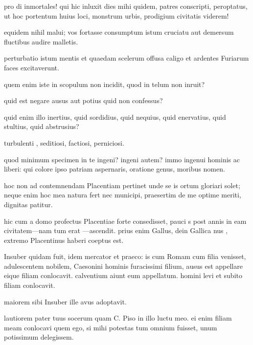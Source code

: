 
 pro di inmortales! qui hic inluxit dies mihi quidem, patres conscripti, peroptatus, ut hoc portentum huius loci, monstrum urbis, prodigium civitatis viderem!

 equidem nihil malui; vos fortasse consumptum istum cruciatu aut demersum fluctibus audire malletis.

 perturbatio istum mentis et quaedam scelerum offusa caligo et ardentes Furiarum faces excitaverunt.

 quem enim iste in scopulum non incidit, quod in telum non inruit?

 quid est negare ausus aut potius quid non confessus?

 quid enim illo inertius, quid sordidius, quid nequius, quid enervatius, quid stultius, quid abstrusius?

 turbulenti , seditiosi, factiosi, perniciosi.

 quod minimum specimen in te ingeni? ingeni autem? immo ingenui hominis ac liberi: qui colore ipso patriam aspernaris, oratione genus, moribus nomen.

 hoc non ad contemnendam Placentiam pertinet unde se is ortum gloriari solet; neque enim hoc mea natura fert nec municipi, praesertim de me optime meriti, dignitas patitur.

 hic cum a domo profectus Placentiae forte consedisset, pauci s post annis in eam civitatem—nam tum erat —ascendit. prius enim Gallus, dein Gallica nus , extremo Placentinus haberi coeptus est.

 Insuber quidam fuit, idem mercator et praeco: is cum Romam cum filia venisset, adulescentem nobilem, Caesonini hominis furacissimi filium, ausus est appellare eique filiam conlocavit. calventium aiunt eum appellatum. homini levi et subito filiam conlocavit.

 maiorem sibi Insuber ille avus adoptavit.

 lautiorem pater tuus socerum quam C. Piso in illo luctu meo. ei enim filiam meam conlocavi quem ego, si mihi potestas tum omnium fuisset, unum potissimum delegissem.

